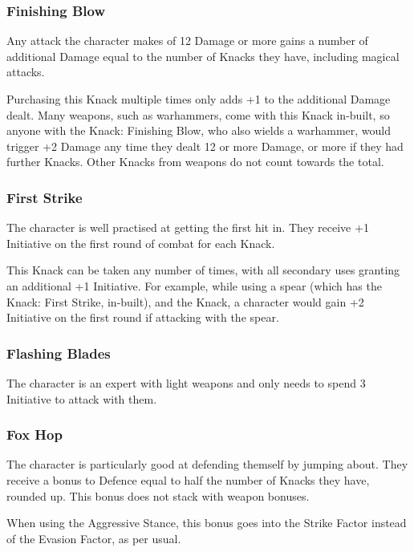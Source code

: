 \begin{multicols}{2}
\subsubsection{Finishing Blow}\label{finishingblow}

Any attack the character makes of 12 Damage or more gains a number of additional Damage equal to the number of Knacks they have, including magical attacks.

Purchasing this Knack multiple times only adds +1 to the additional Damage dealt.
Many weapons, such as warhammers, come with this Knack in-built, so anyone with the Knack: Finishing Blow, who also wields a warhammer, would trigger +2 Damage any time they dealt 12 or more Damage, or more if they had further Knacks.
Other Knacks from weapons do not count towards the total.

\subsubsection{First Strike}\label{firststrike}

The character is well practised at getting the first hit in.
They receive +1 Initiative on the first \gls{round} of combat for each Knack.

This Knack can be taken any number of times, with all secondary uses granting an additional +1 Initiative.
For example, while using a spear (which has the Knack: First Strike, in-built), and the Knack, a character would gain +2 Initiative on the first \gls{round} if attacking with the spear.

\subsubsection{Flashing Blades}

The character is an expert with light weapons and only needs to spend 3 Initiative to attack with them.

\subsubsection{Fox Hop}
The character is particularly good at defending themself by jumping about. They receive a bonus to Defence equal to half the number of Knacks they have, rounded up. This bonus does not stack with weapon bonuses.

When using the Aggressive Stance, this bonus goes into the Strike Factor instead of the Evasion Factor, as per usual.


\end{multicols}
